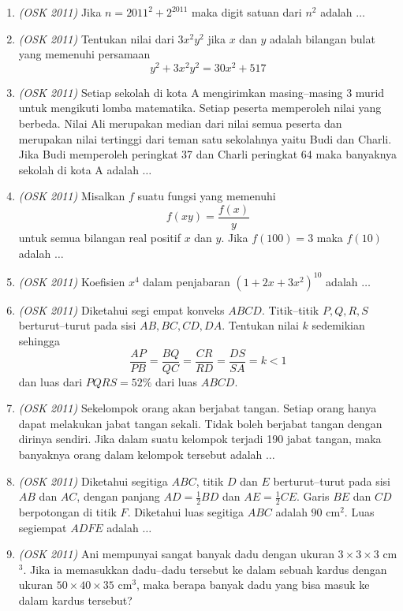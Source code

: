 \begin{enumerate}
	\item \textit{(OSK 2011)} Jika $n = 2011^2 + 2^{2011}$ maka digit satuan dari $n^2$ adalah $\dots$
	
	\item \textit{(OSK 2011)} Tentukan nilai dari $3x^2 y^2$ jika $x$ dan $y$ adalah bilangan bulat yang memenuhi persamaan  
	\[
	y^2 + 3x^2 y^2 = 30x^2 + 517
	\]
	
	\item \textit{(OSK 2011)} Setiap sekolah di kota A mengirimkan masing–masing 3 murid untuk mengikuti lomba matematika. Setiap peserta memperoleh nilai yang berbeda. Nilai Ali merupakan median dari nilai semua peserta dan merupakan nilai tertinggi dari teman satu sekolahnya yaitu Budi dan Charli. Jika Budi memperoleh peringkat 37 dan Charli peringkat 64 maka banyaknya sekolah di kota A adalah $\dots$
	
	\item \textit{(OSK 2011)} Misalkan $f$ suatu fungsi yang memenuhi  
	\[
	f(xy) = \frac{f(x)}{y}
	\]
	untuk semua bilangan real positif $x$ dan $y$. Jika $f(100) = 3$ maka $f(10)$ adalah $\dots$
	
	\item \textit{(OSK 2011)} Koefisien $x^4$ dalam penjabaran $(1 + 2x + 3x^2)^{10}$ adalah $\dots$
	
	\item \textit{(OSK 2011)} Diketahui segi empat konveks $ABCD$. Titik–titik $P,Q,R,S$ berturut–turut pada sisi $AB, BC, CD, DA$. Tentukan nilai $k$ sedemikian sehingga  
	\[
	\frac{AP}{PB} = \frac{BQ}{QC} = \frac{CR}{RD} = \frac{DS}{SA} = k < 1
	\]
	dan luas dari $PQRS = 52\%$ dari luas $ABCD$.
	
	\item \textit{(OSK 2011)} Sekelompok orang akan berjabat tangan. Setiap orang hanya dapat melakukan jabat tangan sekali. Tidak boleh berjabat tangan dengan dirinya sendiri. Jika dalam suatu kelompok terjadi 190 jabat tangan, maka banyaknya orang dalam kelompok tersebut adalah $\dots$
	
	\item \textit{(OSK 2011)} Diketahui segitiga $ABC$, titik $D$ dan $E$ berturut–turut pada sisi $AB$ dan $AC$, dengan panjang $AD = \frac12 BD$ dan $AE = \frac12 CE$. Garis $BE$ dan $CD$ berpotongan di titik $F$. Diketahui luas segitiga $ABC$ adalah $90$ cm$^2$. Luas segiempat $ADFE$ adalah $\dots$
	
	\item \textit{(OSK 2011)} Ani mempunyai sangat banyak dadu dengan ukuran $3 \times 3 \times 3$ cm$^3$. Jika ia memasukkan dadu–dadu tersebut ke dalam sebuah kardus dengan ukuran $50 \times 40 \times 35$ cm$^3$, maka berapa banyak dadu yang bisa masuk ke dalam kardus tersebut?
\end{enumerate}

